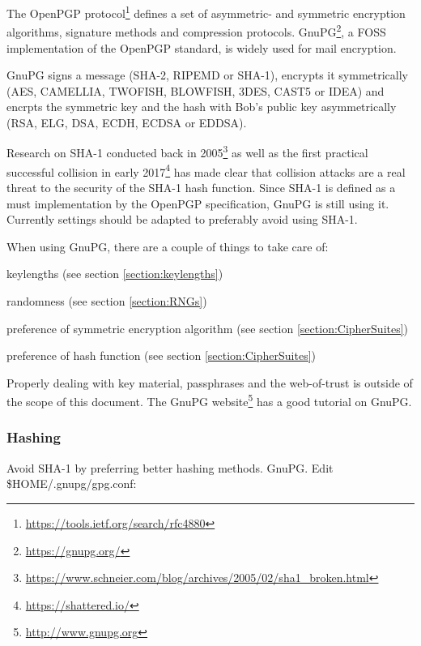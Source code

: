 \gdef\currentsectionname{GPG}
\gdef\currentsubsectionname{GnuPG}

The OpenPGP protocol\footnote{\url{https://tools.ietf.org/search/rfc4880}} defines a set of asymmetric- and symmetric encryption algorithms, signature methods and compression protocols. GnuPG\footnote{\url{https://gnupg.org/}}, a FOSS implementation of the OpenPGP standard, is widely used for mail encryption.
 
GnuPG signs a message (SHA-2, RIPEMD or SHA-1), encrypts it symmetrically (AES, CAMELLIA, TWOFISH, BLOWFISH, 3DES, CAST5 or IDEA) and encrpts the symmetric key and the hash with Bob's public key asymmetrically (RSA, ELG, DSA, ECDH, ECDSA or EDDSA).

Research on SHA-1 conducted back in 2005\footnote{\url{https://www.schneier.com/blog/archives/2005/02/sha1\_broken.html}} as well as the first practical successful collision in early 2017\footnote{\url{https://shattered.io/}} has made clear that collision attacks are a real threat to the security of the SHA-1 hash function. Since SHA-1 is defined as a must implementation by the OpenPGP specification, GnuPG is still using it. Currently settings should be adapted to preferably avoid using SHA-1. 

When using GnuPG, there are a couple of things to take care of:
\begin{itemize*}
  \item keylengths (see section \ref{section:keylengths})
  \item randomness (see section \ref{section:RNGs})
  \item preference of symmetric encryption algorithm (see section \ref{section:CipherSuites})
  \item preference of hash function (see section \ref{section:CipherSuites})
\end{itemize*}

Properly dealing with key material, passphrases and the web-of-trust is outside of the scope of this document. The GnuPG
website\footnote{\url{http://www.gnupg.org}} has a good tutorial on GnuPG.

\subsubsection{Hashing}
Avoid SHA-1 by preferring better hashing methods. GnuPG. Edit \$HOME/.gnupg/gpg.conf:


